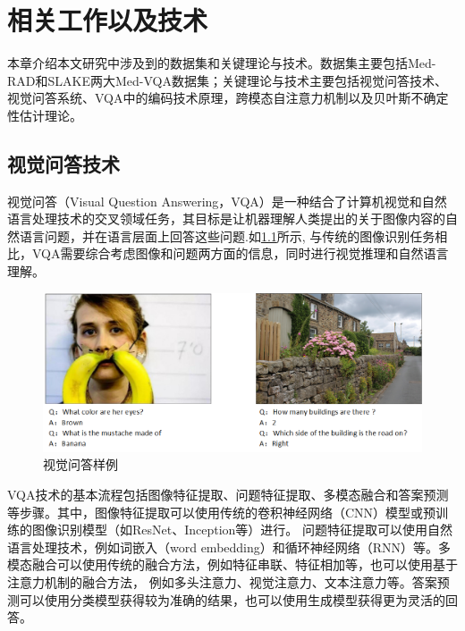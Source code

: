 \chapter{相关工作以及技术}
本章介绍本文研究中涉及到的数据集和关键理论与技术。数据集主要包括Med-RAD和SLAKE两大Med-VQA数据集；关键理论与技术主要包括视觉问答技术、视觉问答系统、VQA中的编码技术原理，跨模态自注意力机制以及贝叶斯不确定性估计理论。

\section{视觉问答技术}
视觉问答\cite{antol2015vqa}（Visual Question Answering，VQA）是一种结合了计算机视觉和自然语言处理技术的交叉领域任务，其目标是让机器理解人类提出的关于图像内容的自然语言问题，并在语言层面上回答这些问题.如\ref{vqademo}所示,
与传统的图像识别任务相比，VQA需要综合考虑图像和问题两方面的信息，同时进行视觉推理和自然语言理解。
\begin{figure}[htbp]
	\centering	
	\includegraphics[width=1\textwidth]{Fig/myfig/chapter2/vqademo.png}  %
	\caption{\label{vqademo}视觉问答样例} 
\end{figure}

VQA技术的基本流程包括图像特征提取、问题特征提取、多模态融合和答案预测等步骤。其中，图像特征提取可以使用传统的卷积神经网络（CNN）模型或预训练的图像识别模型（如ResNet、Inception等）进行。
问题特征提取可以使用自然语言处理技术，例如词嵌入\cite{}（word embedding）和循环神经网络（RNN）等。多模态融合可以使用传统的融合方法，例如特征串联、特征相加等，也可以使用基于注意力机制的融合方法，
例如多头注意力、视觉注意力、文本注意力等。答案预测可以使用分类模型获得较为准确的结果，也可以使用生成模型获得更为灵活的回答。

